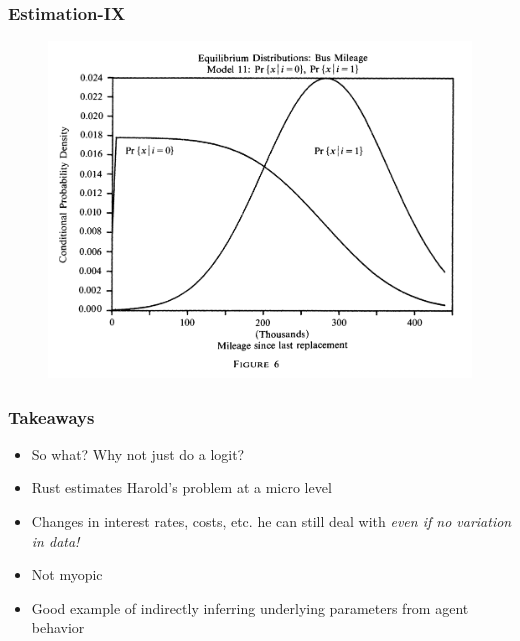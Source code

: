 \documentclass{beamer}
\begin{document}
\begin{frame}
\frametitle{Estimation-IX}
\begin{center}
\begin{figure}[h!]
\includegraphics[scale =0.3]{Figure6.png}
\end{figure}
\end{center}
\end{frame}




\begin{frame}
\frametitle{Takeaways}
\begin{itemize}
\item<1-> So what?  Why not just do a logit?
\bigskip
\item<2-> Rust estimates Harold's problem at a micro level
\bigskip
\item<3-> Changes in interest rates, costs, etc. he can still deal with \emph{even if no variation in data!} 
\bigskip
\item<4-> Not myopic
\bigskip
\item<5-> Good example of indirectly inferring underlying parameters from agent behavior
\end{itemize}
\end{frame}
\end{document}
